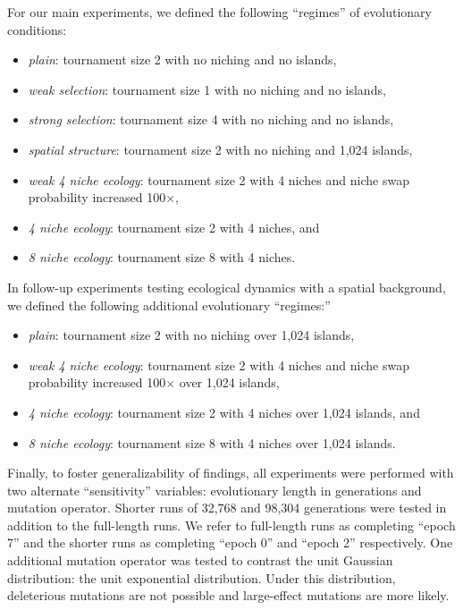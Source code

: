 For our main experiments, we defined the following ``regimes'' of evolutionary conditions:
\begin{itemize}
  \item \textit{plain}: tournament size 2 with no niching and no islands,
  \item \textit{weak selection}: tournament size 1 with no niching and no islands,
  \item \textit{strong selection}: tournament size 4 with no niching and no islands,
  \item \textit{spatial structure}: tournament size 2 with no niching and 1,024 islands,
  \item \textit{weak 4 niche ecology}: tournament size 2 with 4 niches and niche swap probability increased 100$\times$,
  \item \textit{4 niche ecology}: tournament size 2 with 4 niches, and
  \item \textit{8 niche ecology}: tournament size 8 with 4 niches.
\end{itemize}

In follow-up experiments testing ecological dynamics with a spatial background, we defined the following additional evolutionary ``regimes:''
\begin{itemize}
  \item \textit{plain}: tournament size 2 with no niching over 1,024 islands,
  \item \textit{weak 4 niche ecology}: tournament size 2 with 4 niches and niche swap probability increased 100$\times$ over 1,024 islands,
  \item \textit{4 niche ecology}: tournament size 2 with 4 niches over 1,024 islands, and
  \item \textit{8 niche ecology}: tournament size 8 with 4 niches over 1,024 islands.
\end{itemize}

Finally, to foster generalizability of findings, all experiments were performed with two alternate ``sensitivity'' variables: evolutionary length in generations and mutation operator.
Shorter runs of 32,768 and 98,304 generations were tested in addition to the full-length runs.
We refer to full-length runs as completing ``epoch 7'' and the shorter runs as completing ``epoch 0'' and ``epoch 2'' respectively.
One additional mutation operator was tested to contrast the unit Gaussian distribution: the unit exponential distribution.
Under this distribution, deleterious mutations are not possible and large-effect mutations are more likely.

